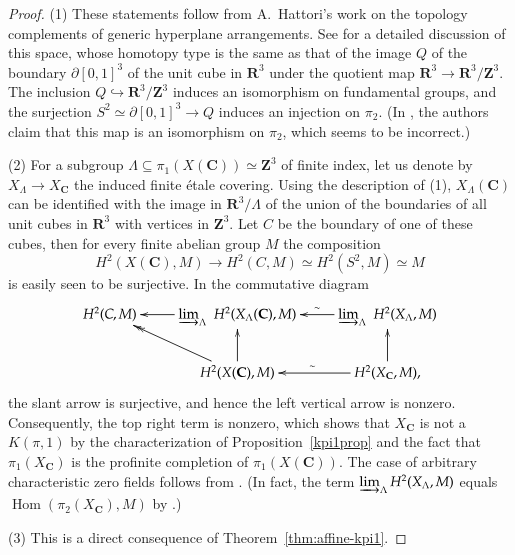 \documentclass[twoside]{amsart}
\newcommand{\CC}{\mathbf{C}}
\newcommand{\RR}{\mathbf{R}}
\newcommand{\ZZ}{\mathbf{Z}}
\DeclareMathOperator{\Hom}{Hom}
\newcommand{\isom}{\simeq}
\renewcommand{\to}{\longrightarrow}
\theoremstyle{plain}
\theoremstyle{definition}
\theoremstyle{remark}
\numberwithin{equation}{subsection}
\begin{document}
\begin{proof}
(1) These statements follow from A.~Hattori's work \cite{Hattori} on the topology complements of generic hyperplane arrangements. See \cite[Example~5.24]{OrlikTerao} for a detailed discussion of this space, whose homotopy type is the same as that of the image $Q$ of the boundary $\partial [0,1]^3$ of the unit cube in $\RR^3$ under the quotient map $\RR^3 \to \RR^3/\ZZ^3$. The inclusion $Q\hookrightarrow \RR^3/\ZZ^3$ induces an isomorphism on fundamental groups, and the surjection $S^2\isom \partial [0,1]^3\to Q$ induces an injection on $\pi_2$. (In \cite[Example~5.24]{OrlikTerao}, the authors claim that this map is an isomorphism on $\pi_2$, which seems to be incorrect.)

(2) 
For a subgroup $\Lambda\subseteq \pi_1(X(\CC))\isom\ZZ^3$ of finite index, let us denote by $X_\Lambda\to X_\CC$ the induced finite \'etale covering. Using the description of (1), $X_\Lambda(\CC)$ can be identified with the image in $\RR^3/\Lambda$ of the union of the boundaries of all unit cubes in $\RR^3$ with vertices in $\ZZ^3$. Let $C$ be the boundary of one of these cubes, then for every finite abelian group $M$ the composition
\[ 
	H^2(X(\CC), M)\to H^2(C, M)\isom H^2(S^2, M)\isom M 
\] 
is easily seen to be surjective. In the commutative diagram
\[ 
\xymatrix{
		H^2(C, M)  & \varinjlim_\Lambda\,\, H^2(X_\Lambda(\CC), M) \ar[l]  & \varinjlim_\Lambda\,\, H^2(X_{\Lambda}, M) \ar[l]_-\sim \\
		& H^2(X(\CC), M)  \ar@{>>}[ul] \ar[u] & H^2(X_\CC, M), \ar[l]_\sim \ar[u]
	}
\]
the slant arrow is surjective, and hence the left vertical arrow is nonzero. Consequently, the top right term is nonzero, which shows that $X_\CC$ is not a $K(\pi, 1)$ by the characterization of Proposition~\ref{kpi1prop} and the fact that $\pi_1(X_\CC)$ is the profinite completion of $\pi_1(X(\CC))$. The case of arbitrary characteristic zero fields follows from \cite[Proposition~3.2(c)]{Achinger}. (In fact, the term $\varinjlim_\Lambda H^2(X_\Lambda, M)$ equals $\Hom(\pi_2(X_\CC), M)$ by \cite[Proposition~6.3]{ArtinMazur}.)

(3) This is a direct consequence of Theorem~\ref{thm:affine-kpi1}.   
\end{proof}
\end{document}
